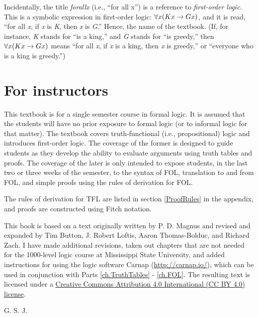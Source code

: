 Incidentally, the title \textit{forall\hspace{.10em}x} (i.e., ``for all x'') is a reference to \textit{first-order logic}. This is a symbolic expression in first-order logic: $\forall x(Kx \rightarrow Gx)$, and it is read, “for all \textit{x}, if \textit{x} is \textit{K}, then \textit{x} is \textit{G}.” Hence, the name of the textbook. (If, for instance, \textit{K} stands for ``is a king,'' and \textit{G} stands for ``is greedy,'' then $\forall x(Kx \rightarrow Gx)$ means ``for all \textit{x}, if \textit{x} is a king, then \textit{x} is greedy,'' or ``everyone who is a king is greedy.'') 


\section{For instructors}

This textbook is for a single semester course in formal logic. It is assumed that the students will have no prior exposure to formal logic (or to informal logic for that matter). The textbook covers truth-functional (i.e., propositional) logic and introduces first-order logic. The coverage of the former is designed to guide students as they develop the ability to evaluate arguments using truth tables and proofs. The coverage of the later is only intended to expose students, in the last two or three weeks of the semester, to the syntax of FOL, translation to and from FOL, and simple proofs using the rules of derivation for FOL. 

The rules of derivation for TFL are listed in section \ref{ProofRules} in the appendix, and proofs are constructed using Fitch notation.

This book is based on a text originally written by P. D. Magnus and revised and expanded by Tim Button, J. Robert Loftis, Aaron Thomas-Bolduc, and Richard Zach. I have made additional revisions, taken out chapters that are not needed for the 1000-level logic course at Mississippi State University, and added instructions for using the logic software Carnap (\href{http://carnap.io/}{http://carnap.io/}), which can be used in conjunction with Parts \ref{ch.TruthTables} - \ref{ch.FOL}. The resulting text is licensed under a \href{https://creativecommons.org/licenses/by/4.0/}{Creative Commons Attribution 4.0 International (CC BY 4.0) license}. 

\smallskip
\hspace*{\fill} G. S. J.

 